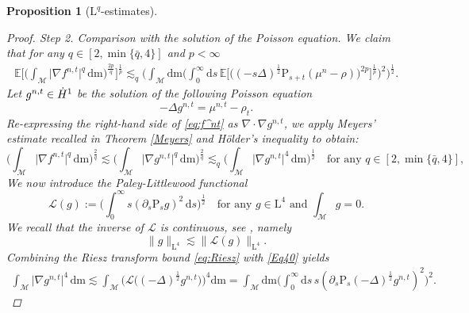\documentclass[11pt,a4paper,oneside]{amsart}
\numberwithin{equation}{section}
\newtheorem{proposition}[theorem]{Proposition}
\newcommand{\dd}{\mathrm{d}}
\newcommand{\LL}{\mathrm{L}}
\newcommand{\m}{\mathrm{m}}
\begin{document}
\begin{proposition}[$\LL^{q}$-estimates]
\begin{proof}
{\sc Step 2. Comparison with the solution of the Poisson equation. }We claim that for any $q\in [2,\min\{\bar q,4\}]$ and $p<\infty$
%
\begin{equation}\label{Eq51}
\begin{aligned}
%
\mathbb{E}\bigg[\Big(\int_{\mathcal{M}}\vert \nabla f^{n,t}\vert^q\,\dd\m\Big)^{\frac{2p}{q}}\bigg]^{\frac{1}{p}}\lesssim_q \bigg(\int_{\mathcal{M}}\dd\m\bigg(\int_{0}^{\infty}\dd s\,\mathbb{E}\Big[\Big((-s\Delta)^{\frac{1}{2}}\text{P}_{s+t}(\mu^n-\rho)\Big)^{2p}\Big]^{\frac{1}{p}}\bigg)^2\bigg)^{\frac{1}{2}}.
%
\end{aligned}
\end{equation}
%
Let $g^{n,t}\in {\rm \dot{H}^1}$ be the solution of the following Poisson equation 
%
\begin{equation}\label{Eq47}
        -\Delta g^{n,t} =\mu^{n,t}-\rho_t.
\end{equation}
%
Re-expressing the right-hand side of \eqref{eq:f^nt} as $\nabla\cdot \nabla g^{n,t}$, we apply Meyers' estimate recalled in Theorem \ref{Meyers} and Hölder's inequality to obtain: 
%
\begin{equation}\label{Eq41}
\Big(\int_\mathcal{M} \vert\nabla f^{n,t}\vert^{q}\,\dd\m\Big)^\frac{2}{q}\lesssim \Big(\int_\mathcal{M} \vert\nabla g^{n,t}\vert^{q}\,\dd\m\Big)^\frac{2}{q}\lesssim_q\Big(\int_\mathcal{M} \vert\nabla g^{n,t}\vert^{4}\,\dd\m\Big)^\frac{1}{2}\quad\text{for any $q\in [2,\min\{\bar q,4\}]$,}
\end{equation}
%
We now introduce the Paley-Littlewood functional
%
$$\mathcal{L}(g):=\Big(\int_{0}^{\infty}s(\partial_s\text{P}_s g)^2\,\dd s\Big)^{\frac{1}{2}}\quad \text{for any $g\in \LL^{4}$ and $\int_{\mathcal{M}} g=0$.}$$
%
We recall that the inverse of $\mathcal{L}$ is continuous, see \cite{stein2016topics}, namely
%
\begin{equation}\label{Eq40}
\|g\|_{\LL^{4}}\lesssim \|\mathcal{L}(g)\|_{\LL^{4}}.
\end{equation}
%
Combining the Riesz transform bound \eqref{eq:Riesz} with \eqref{Eq40} yields
%
\begin{equation}\label{Eq50}
\begin{aligned}
\int_{\mathcal{M}}\vert\nabla g^{n,t}\vert^4\,\dd\m\lesssim\int_{\mathcal{M}}\Big(\mathcal{L}\Big((-\Delta)^{\frac{1}{2}}g^{n,t}\Big)\Big)^4\dd\m
=\int_{\mathcal{M}}\dd\m\Big(\int_{0}^{\infty}\dd s\, s(\partial_s\text{P}_s(-\Delta)^{\frac{1}{2}} g^{n,t})^2\Big)^{2}.
\end{aligned}
\end{equation}

\end{proof}
\end{proposition}
\end{document}
